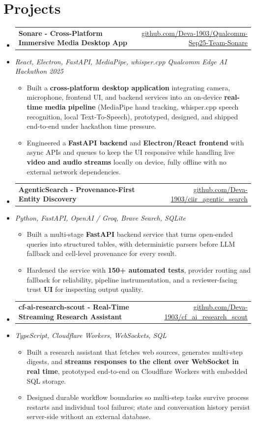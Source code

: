 \documentclass[letterpaper,10pt]{article}
\makeatletter
\newcommand{\resumeItem}[1]{
  \item\small{#1\vspace{-1pt}}
}
\newcommand{\resumeProjectHeading}[2]{
    \item
    \begin{tabular*}{0.985\textwidth}[t]{l@{\extracolsep{\fill}}r}
      \small\textbf{#1} & \small #2 \\
    \end{tabular*}\vspace{-5pt}
}
\newcommand{\resumeProjectSubheading}[1]{
  \vspace{-2pt}\item[] {\small\textcolor{ResumeSlate}{\emph{#1}}}\vspace{-3pt}
}
\newcommand{\resumeSubHeadingListStart}{\begin{itemize}[leftmargin=0.0in, label={}, itemsep=2pt, topsep=2pt]}
\newcommand{\resumeSubHeadingListEnd}{\end{itemize}}
\newcommand{\resumeItemListStart}{\begin{itemize}[leftmargin=0.18in, itemsep=2pt, topsep=1pt]}
\newcommand{\resumeItemListEnd}{\end{itemize}\vspace{-4pt}}
\makeatother
\begin{document}
\section{Projects}
\resumeSubHeadingListStart
  \resumeProjectHeading
    {Sonare - Cross-Platform Immersive Media Desktop App}
    {\href{https://github.com/Deva-1903/Qualcomm-Sep25-Team-Sonare}{github.com/Deva-1903/Qualcomm-Sep25-Team-Sonare}}
  \resumeProjectSubheading{React, Electron, FastAPI, MediaPipe, whisper.cpp \enspace\textbar\enspace Qualcomm Edge AI Hackathon 2025}
    \resumeItemListStart
      \resumeItem{Built a \textbf{cross-platform desktop application} integrating camera, microphone, frontend UI, and backend services into an on-device \textbf{real-time media pipeline} (MediaPipe hand tracking, whisper.cpp speech recognition, local Text-To-Speech), prototyped, designed, and shipped end-to-end under hackathon time pressure.}
      \resumeItem{Engineered a \textbf{FastAPI backend} and \textbf{Electron/React frontend} with async APIs and queues to keep the UI responsive while handling live \textbf{video and audio streams} locally on device, fully offline with no external network dependencies.}
    \resumeItemListEnd
  \resumeProjectHeading
    {AgenticSearch - Provenance-First Entity Discovery}
    {\href{https://github.com/Deva-1903/ciir_agentic_search}{github.com/Deva-1903/ciir\_agentic\_search}}
  \resumeProjectSubheading{Python, FastAPI, OpenAI / Groq, Brave Search, SQLite}
    \resumeItemListStart
      \resumeItem{Built a multi-stage \textbf{FastAPI} backend service that turns open-ended queries into structured tables, with deterministic parsers before LLM fallback and cell-level provenance for every result.}
      \resumeItem{Hardened the service with \textbf{150+ automated tests}, provider routing and fallback for reliability, pipeline instrumentation, and a reviewer-facing trust \textbf{UI} for inspecting output quality.}
    \resumeItemListEnd
  \resumeProjectHeading
    {cf-ai-research-scout - Real-Time Streaming Research Assistant}
    {\href{https://github.com/Deva-1903/cf_ai_research_scout}{github.com/Deva-1903/cf\_ai\_research\_scout}}
  \resumeProjectSubheading{TypeScript, Cloudflare Workers, WebSockets, SQL}
    \resumeItemListStart
      \resumeItem{Built a research assistant that fetches web sources, generates multi-step digests, and \textbf{streams responses to the client over WebSocket in real time}, prototyped end-to-end on Cloudflare Workers with embedded SQL storage.}
      \resumeItem{Designed durable workflow boundaries so multi-step tasks survive process restarts and individual tool failures; state and conversation history persist server-side without an external database.}
    \resumeItemListEnd
\resumeSubHeadingListEnd
\vspace{-4pt}
\end{document}
